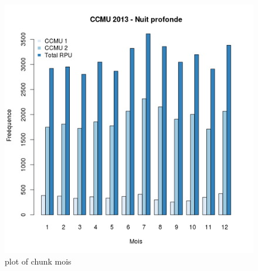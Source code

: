 \begin{figure}[htbp]
\centering
\includegraphics{figure/mois11.png}
\caption{plot of chunk mois}
\end{figure}

